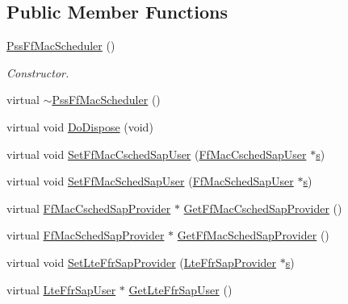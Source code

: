 \subsection*{Public Member Functions}
\begin{DoxyCompactItemize}
\item 
\hyperlink{classns3_1_1PssFfMacScheduler_ac74abd1f46b26a6ba4050f19d9fb45ff}{Pss\+Ff\+Mac\+Scheduler} ()
\begin{DoxyCompactList}\small\item\em Constructor. \end{DoxyCompactList}\item 
virtual \hyperlink{classns3_1_1PssFfMacScheduler_ae9e7fc2f0f8648c25462e9c4884eab17}{$\sim$\+Pss\+Ff\+Mac\+Scheduler} ()
\item 
virtual void \hyperlink{classns3_1_1PssFfMacScheduler_aef17051a95160a1b1239430c1f5b942b}{Do\+Dispose} (void)
\item 
virtual void \hyperlink{classns3_1_1PssFfMacScheduler_a9984af36c22b8a8d03ea315986ac6f91}{Set\+Ff\+Mac\+Csched\+Sap\+User} (\hyperlink{classns3_1_1FfMacCschedSapUser}{Ff\+Mac\+Csched\+Sap\+User} $\ast$\hyperlink{generate__test__data__lte__sinr_8m_ad83eeb3a142285d1243a08c6b7026df8}{s})
\item 
virtual void \hyperlink{classns3_1_1PssFfMacScheduler_adc587ebc6984d038f02da5f67c053f45}{Set\+Ff\+Mac\+Sched\+Sap\+User} (\hyperlink{classns3_1_1FfMacSchedSapUser}{Ff\+Mac\+Sched\+Sap\+User} $\ast$\hyperlink{generate__test__data__lte__sinr_8m_ad83eeb3a142285d1243a08c6b7026df8}{s})
\item 
virtual \hyperlink{classns3_1_1FfMacCschedSapProvider}{Ff\+Mac\+Csched\+Sap\+Provider} $\ast$ \hyperlink{classns3_1_1PssFfMacScheduler_af128210fa97ceff88a9afedd2d65a6e3}{Get\+Ff\+Mac\+Csched\+Sap\+Provider} ()
\item 
virtual \hyperlink{classns3_1_1FfMacSchedSapProvider}{Ff\+Mac\+Sched\+Sap\+Provider} $\ast$ \hyperlink{classns3_1_1PssFfMacScheduler_a4ca725f3c193a47af8eb81caf07c0688}{Get\+Ff\+Mac\+Sched\+Sap\+Provider} ()
\item 
virtual void \hyperlink{classns3_1_1PssFfMacScheduler_a8f5a1ecdf9b7546b2f915c8b258beb9f}{Set\+Lte\+Ffr\+Sap\+Provider} (\hyperlink{classns3_1_1LteFfrSapProvider}{Lte\+Ffr\+Sap\+Provider} $\ast$\hyperlink{generate__test__data__lte__sinr_8m_ad83eeb3a142285d1243a08c6b7026df8}{s})
\item 
virtual \hyperlink{classns3_1_1LteFfrSapUser}{Lte\+Ffr\+Sap\+User} $\ast$ \hyperlink{classns3_1_1PssFfMacScheduler_a1997fd997f2826515cdb80dbc4af838d}{Get\+Lte\+Ffr\+Sap\+User} ()

\end{DoxyCompactItemize}

